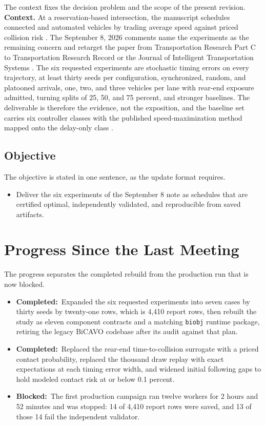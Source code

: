 \documentclass[10pt]{article}
\newcommand{\statusdone}{\textcolor{definitiongreen}{\textbf{Completed:}}\ }
\newcommand{\statusblocked}{\textcolor{accent}{\textbf{Blocked:}}\ }
\newenvironment{tightitems}{%
  \begin{itemize}[leftmargin=1.15em,label=\textcolor{uablue}{\scriptsize$\bullet$},
    topsep=0.10em,itemsep=0.16em,parsep=0pt,partopsep=0pt]}{\end{itemize}}
\begin{document}
\sumpara The context fixes the decision problem and the scope of the present revision. \sumparaend
\noindent\textbf{Context.}
\fin At a reservation-based intersection, the manuscript schedules connected and automated vehicles by trading average speed against priced collision risk \cite{ma2025socio}. \fine
\fin The September 8, 2026 comments name the experiments as the remaining concern and retarget the paper from Transportation Research Part C to Transportation Research Record or the Journal of Intelligent Transportation Systems \cite{gong2026}. \fine
\fin The six requested experiments are stochastic timing errors on every trajectory, at least thirty seeds per configuration, synchronized, random, and platooned arrivals, one, two, and three vehicles per lane with rear-end exposure admitted, turning splits of 25, 50, and 75 percent, and stronger baselines. \fine
\fin The deliverable is therefore the evidence, not the exposition, and the baseline set carries six controller classes with the published speed-maximization method mapped onto the delay-only class \cite{ma2023speed}. \fine

\subsection{Objective}
\label{sec:objective:statement}

\sumpara The objective is stated in one sentence, as the update format requires. \sumparaend
\begin{tightitems}
  \item \fin Deliver the six experiments of the September 8 note as schedules that are certified optimal, independently validated, and reproducible from saved artifacts. \fine
\end{tightitems}

\section{Progress Since the Last Meeting}
\label{sec:progress}

\sumpara The progress separates the completed rebuild from the production run that is now blocked. \sumparaend
\begin{tightitems}
  \item \fin \statusdone Expanded the six requested experiments into seven cases by thirty seeds by twenty-one rows, which is 4,410 report rows, then rebuilt the study as eleven component contracts and a matching \texttt{biobj} runtime package, retiring the legacy BiCAVO codebase after its audit against that plan. \fine
  \item \fin \statusdone Replaced the rear-end time-to-collision surrogate with a priced contact probability, replaced the thousand draw replay with exact expectations at each timing error width, and widened initial following gaps to hold modeled contact risk at or below 0.1 percent. \fine
  \item \fin \statusblocked The first production campaign ran twelve workers for 2 hours and 52 minutes and was stopped: 14 of 4,410 report rows were saved, and 13 of those 14 fail the independent validator. \fine
\end{tightitems}
\end{document}
